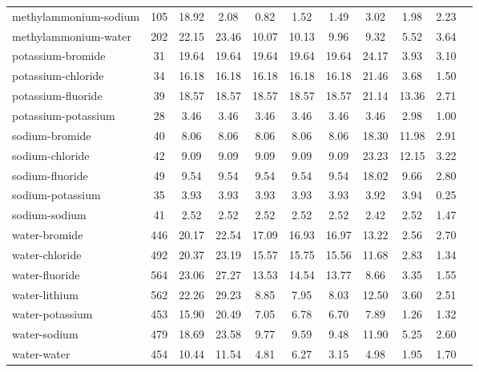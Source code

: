 \begin{longtable}{lcccccccccc}
methylammonium-sodium & 105  & 18.92 & 2.08 & 0.82 & 1.52 & 1.49 & 3.02 & 1.98 & 2.23\\
methylammonium-water & 202  & 22.15 & 23.46 & 10.07 & 10.13 & 9.96 & 9.32 & 5.52 & 3.64\\
potassium-bromide & 31  & 19.64 & 19.64 & 19.64 & 19.64 & 19.64 & 24.17 & 3.93 & 3.10\\
potassium-chloride & 34  & 16.18 & 16.18 & 16.18 & 16.18 & 16.18 & 21.46 & 3.68 & 1.50\\
potassium-fluoride & 39  & 18.57 & 18.57 & 18.57 & 18.57 & 18.57 & 21.14 & 13.36 & 2.71\\
potassium-potassium & 28  & 3.46 & 3.46 & 3.46 & 3.46 & 3.46 & 3.46 & 2.98 & 1.00\\
sodium-bromide & 40  & 8.06 & 8.06 & 8.06 & 8.06 & 8.06 & 18.30 & 11.98 & 2.91\\
sodium-chloride & 42  & 9.09 & 9.09 & 9.09 & 9.09 & 9.09 & 23.23 & 12.15 & 3.22\\
sodium-fluoride & 49  & 9.54 & 9.54 & 9.54 & 9.54 & 9.54 & 18.02 & 9.66 & 2.80\\
sodium-potassium & 35  & 3.93 & 3.93 & 3.93 & 3.93 & 3.93 & 3.92 & 3.94 & 0.25\\
sodium-sodium & 41  & 2.52 & 2.52 & 2.52 & 2.52 & 2.52 & 2.42 & 2.52 & 1.47\\
water-bromide & 446  & 20.17 & 22.54 & 17.09 & 16.93 & 16.97 & 13.22 & 2.56 & 2.70\\
water-chloride & 492  & 20.37 & 23.19 & 15.57 & 15.75 & 15.56 & 11.68 & 2.83 & 1.34\\
water-fluoride & 564  & 23.06 & 27.27 & 13.53 & 14.54 & 13.77 & 8.66 & 3.35 & 1.55\\
water-lithium & 562  & 22.26 & 29.23 & 8.85 & 7.95 & 8.03 & 12.50 & 3.60 & 2.51\\
water-potassium & 453  & 15.90 & 20.49 & 7.05 & 6.78 & 6.70 & 7.89 & 1.26 & 1.32\\
water-sodium & 479  & 18.69 & 23.58 & 9.77 & 9.59 & 9.48 & 11.90 & 5.25 & 2.60\\
water-water & 454  & 10.44 & 11.54 & 4.81 & 6.27 & 3.15 & 4.98 & 1.95 & 1.70\\
\hline
\end{longtable}
